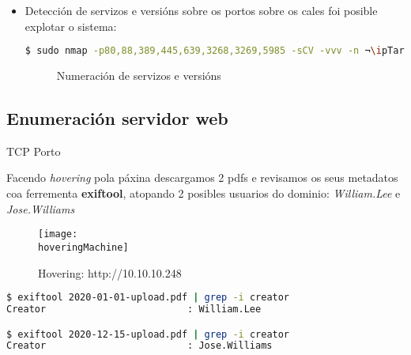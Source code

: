 \documentclass[a4paper]{article}
\newcommand{\nmapTargeted}{nmap_template_targeted.png}
\newcommand{\hoveringMachine}{hovering_template.png}
\newcommand{\ipTarget}{10.10.10.248}
\begin{document}
\begin{itemize}
        \clearpage
        \item Detección de servizos e versións sobre os portos sobre os cales foi posible explotar o sistema:

        \begin{lstlisting}[language=Bash, caption=nmap scripting sobre servizos e versións]
$ sudo nmap -p80,88,389,445,639,3268,3269,5985 -sCV -vvv -n ¬\ipTarget¬
        \end{lstlisting}
         \begin{figure}[h]
                \begin{center}
                \caption{Numeración de servizos e versións}
                \label{fig:servicesResults}
                \end{center}
        \end{figure}

        \end{itemize}
        \subsection{Enumeración servidor web}
        \vspace{0.2cm}

        \begin{schema}{TCP}
        Porto
        \end{schema}
 
        Facendo \textit{hovering} pola páxina descargamos 2 pdfs e revisamos os seus metadatos coa ferrementa \textbf{exiftool}, atopando 2 posibles usuarios do dominio: \textit{William.Lee} e \textit{Jose.Williams}

        \begin{figure}[h]
                \centering
                \texttt{[image: \\hoveringMachine]}
                \caption{Hovering: http://\ipTarget}
        \end{figure}


        \begin{lstlisting}[language=Bash, caption=Metadatos: exiftool]
$ exiftool 2020-01-01-upload.pdf | grep -i creator
Creator                         : William.Lee

$ exiftool 2020-12-15-upload.pdf | grep -i creator
Creator                         : Jose.Williams\end{lstlisting}

        \clearpage
\end{document}
